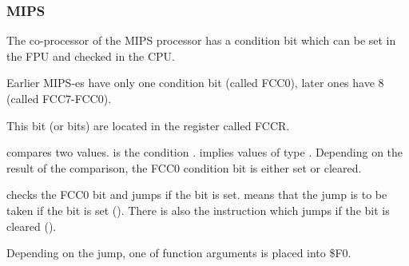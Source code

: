 ﻿\subsubsection{MIPS}

The co-processor of the MIPS processor has a condition bit which can be set in the FPU and checked in the CPU.

Earlier MIPS-es have only one condition bit (called FCC0), later ones have 8 (called FCC7-FCC0).

This bit (or bits) are located in the register called FCCR.



 compares two values. 
 is the condition .
 implies values of type \Tdouble.
Depending on the result of the comparison, the FCC0 condition bit is either set or cleared.

 checks the FCC0 bit and jumps if the bit is set.
 means that the jump is to be taken if the bit is set ().
There is also the instruction  which jumps if the bit is cleared ().

Depending on the jump, one of function arguments is placed into \$F0.
